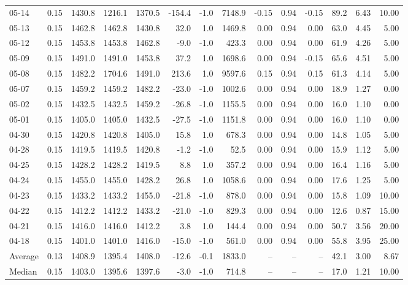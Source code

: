 \begin{threeparttable}
{\begin{tabular}{lrrrrrrrrrrrrr}
05-14 & 0.15 & 1430.8 & 1216.1 & 1370.5 & -154.4 & -1.0 & 7148.9 & -0.15 & 0.94 & -0.15 & 89.2 & 6.43 & 10.00 \\
05-13 & 0.15 & 1462.8 & 1462.8 & 1430.8 & 32.0 & 1.0 & 1469.8 & 0.00 & 0.94 & 0.00 & 63.0 & 4.45 & 5.00 \\
05-12 & 0.15 & 1453.8 & 1453.8 & 1462.8 & -9.0 & -1.0 & 423.3 & 0.00 & 0.94 & 0.00 & 61.9 & 4.26 & 5.00 \\
05-09 & 0.15 & 1491.0 & 1491.0 & 1453.8 & 37.2 & 1.0 & 1698.6 & 0.00 & 0.94 & -0.15 & 65.6 & 4.51 & 5.00 \\
05-08 & 0.15 & 1482.2 & 1704.6 & 1491.0 & 213.6 & 1.0 & 9597.6 & 0.15 & 0.94 & 0.15 & 61.3 & 4.14 & 5.00 \\
05-07 & 0.15 & 1459.2 & 1459.2 & 1482.2 & -23.0 & -1.0 & 1002.6 & 0.00 & 0.94 & 0.00 & 18.9 & 1.27 & 0.00 \\
05-02 & 0.15 & 1432.5 & 1432.5 & 1459.2 & -26.8 & -1.0 & 1155.5 & 0.00 & 0.94 & 0.00 & 16.0 & 1.10 & 0.00 \\
05-01 & 0.15 & 1405.0 & 1405.0 & 1432.5 & -27.5 & -1.0 & 1151.8 & 0.00 & 0.94 & 0.00 & 16.0 & 1.10 & 0.00 \\
04-30 & 0.15 & 1420.8 & 1420.8 & 1405.0 & 15.8 & 1.0 & 678.3 & 0.00 & 0.94 & 0.00 & 14.8 & 1.05 & 5.00 \\
04-28 & 0.15 & 1419.5 & 1419.5 & 1420.8 & -1.2 & -1.0 & 52.5 & 0.00 & 0.94 & 0.00 & 15.9 & 1.12 & 5.00 \\
04-25 & 0.15 & 1428.2 & 1428.2 & 1419.5 & 8.8 & 1.0 & 357.2 & 0.00 & 0.94 & 0.00 & 16.4 & 1.16 & 5.00 \\
04-24 & 0.15 & 1455.0 & 1455.0 & 1428.2 & 26.8 & 1.0 & 1058.6 & 0.00 & 0.94 & 0.00 & 17.6 & 1.25 & 5.00 \\
04-23 & 0.15 & 1433.2 & 1433.2 & 1455.0 & -21.8 & -1.0 & 878.0 & 0.00 & 0.94 & 0.00 & 15.8 & 1.09 & 10.00 \\
04-22 & 0.15 & 1412.2 & 1412.2 & 1433.2 & -21.0 & -1.0 & 829.3 & 0.00 & 0.94 & 0.00 & 12.6 & 0.87 & 15.00 \\
04-21 & 0.15 & 1416.0 & 1416.0 & 1412.2 & 3.8 & 1.0 & 144.4 & 0.00 & 0.94 & 0.00 & 50.7 & 3.56 & 20.00 \\
04-18 & 0.15 & 1401.0 & 1401.0 & 1416.0 & -15.0 & -1.0 & 561.0 & 0.00 & 0.94 & 0.00 & 55.8 & 3.95 & 25.00 \\
Average & 0.13 & 1408.9 & 1395.4 & 1408.0 & -12.6 & -0.1 & 1833.0 & -- & -- & -- & 42.1 & 3.00 & 8.67 \\
Median & 0.15 & 1403.0 & 1395.6 & 1397.6 & -3.0 & -1.0 & 714.8 & -- & -- & -- & 17.0 & 1.21 & 10.00 \\

\end{tabular}}
\end{threeparttable}
